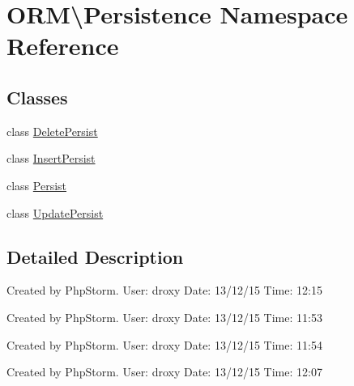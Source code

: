 \hypertarget{namespaceORM_1_1Persistence}{}\section{O\+RM\textbackslash{}Persistence Namespace Reference}
\label{namespaceORM_1_1Persistence}
\subsection*{Classes}
\begin{DoxyCompactItemize}
\item 
class \hyperlink{classORM_1_1Persistence_1_1DeletePersist}{Delete\+Persist}
\item 
class \hyperlink{classORM_1_1Persistence_1_1InsertPersist}{Insert\+Persist}
\item 
class \hyperlink{classORM_1_1Persistence_1_1Persist}{Persist}
\item 
class \hyperlink{classORM_1_1Persistence_1_1UpdatePersist}{Update\+Persist}
\end{DoxyCompactItemize}


\subsection{Detailed Description}
Created by Php\+Storm. User\+: droxy Date\+: 13/12/15 Time\+: 12\+:15

Created by Php\+Storm. User\+: droxy Date\+: 13/12/15 Time\+: 11\+:53

Created by Php\+Storm. User\+: droxy Date\+: 13/12/15 Time\+: 11\+:54

Created by Php\+Storm. User\+: droxy Date\+: 13/12/15 Time\+: 12\+:07 
